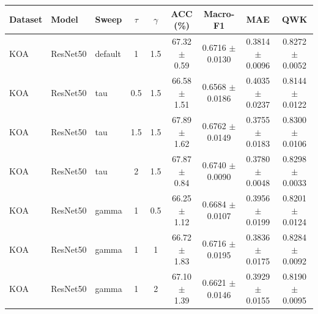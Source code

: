 \begin{tabular}{lllcccccc}
\toprule
Dataset & Model & Sweep & $\tau$ & $\gamma$ & ACC (\%) & Macro-F1 & MAE & QWK \\
\midrule
KOA & ResNet50 & default & 1 & 1.5 & 67.32 $\pm$ 0.59 & 0.6716 $\pm$ 0.0130 & 0.3814 $\pm$ 0.0096 & 0.8272 $\pm$ 0.0052 \\
KOA & ResNet50 & tau & 0.5 & 1.5 & 66.58 $\pm$ 1.51 & 0.6568 $\pm$ 0.0186 & 0.4035 $\pm$ 0.0237 & 0.8144 $\pm$ 0.0122 \\
KOA & ResNet50 & tau & 1.5 & 1.5 & 67.89 $\pm$ 1.62 & 0.6762 $\pm$ 0.0149 & 0.3755 $\pm$ 0.0183 & 0.8300 $\pm$ 0.0106 \\
KOA & ResNet50 & tau & 2 & 1.5 & 67.87 $\pm$ 0.84 & 0.6740 $\pm$ 0.0090 & 0.3780 $\pm$ 0.0048 & 0.8298 $\pm$ 0.0033 \\
KOA & ResNet50 & gamma & 1 & 0.5 & 66.25 $\pm$ 1.12 & 0.6684 $\pm$ 0.0107 & 0.3956 $\pm$ 0.0199 & 0.8201 $\pm$ 0.0124 \\
KOA & ResNet50 & gamma & 1 & 1 & 66.72 $\pm$ 1.83 & 0.6716 $\pm$ 0.0195 & 0.3836 $\pm$ 0.0175 & 0.8284 $\pm$ 0.0092 \\
KOA & ResNet50 & gamma & 1 & 2 & 67.10 $\pm$ 1.39 & 0.6621 $\pm$ 0.0146 & 0.3929 $\pm$ 0.0155 & 0.8190 $\pm$ 0.0095 \\
\bottomrule
\end{tabular}
